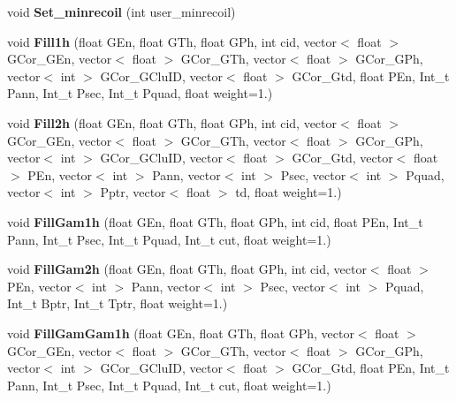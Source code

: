 \begin{DoxyCompactItemize}
\mbox{\label{classhists_acfb845682216224712565e7b8a1c3ce2}} 
void {\bfseries Set\+\_\+minrecoil} (int user\+\_\+minrecoil)
\item 
\mbox{\label{classhists_aa535a1d959dc46235b5d4096c03f37c4}} 
void {\bfseries Fill1h} (float G\+En, float G\+Th, float G\+Ph, int cid, vector$<$ float $>$ G\+Cor\+\_\+\+G\+En, vector$<$ float $>$ G\+Cor\+\_\+\+G\+Th, vector$<$ float $>$ G\+Cor\+\_\+\+G\+Ph, vector$<$ int $>$ G\+Cor\+\_\+\+G\+Clu\+ID, vector$<$ float $>$ G\+Cor\+\_\+\+Gtd, float P\+En, Int\+\_\+t Pann, Int\+\_\+t Psec, Int\+\_\+t Pquad, float weight=1.)
\item 
\mbox{\label{classhists_a265aaf58b352579cd02dfc1a3c011052}} 
void {\bfseries Fill2h} (float G\+En, float G\+Th, float G\+Ph, int cid, vector$<$ float $>$ G\+Cor\+\_\+\+G\+En, vector$<$ float $>$ G\+Cor\+\_\+\+G\+Th, vector$<$ float $>$ G\+Cor\+\_\+\+G\+Ph, vector$<$ int $>$ G\+Cor\+\_\+\+G\+Clu\+ID, vector$<$ float $>$ G\+Cor\+\_\+\+Gtd, vector$<$ float $>$ P\+En, vector$<$ int $>$ Pann, vector$<$ int $>$ Psec, vector$<$ int $>$ Pquad, vector$<$ int $>$ Pptr, vector$<$ float $>$ td, float weight=1.)
\item 
\mbox{\label{classhists_a73bd373657bbd42ab1eeedc816ff99b4}} 
void {\bfseries Fill\+Gam1h} (float G\+En, float G\+Th, float G\+Ph, int cid, float P\+En, Int\+\_\+t Pann, Int\+\_\+t Psec, Int\+\_\+t Pquad, Int\+\_\+t cut, float weight=1.)
\item 
\mbox{\label{classhists_ada7bda91decc166e1a3f970b993b1b20}} 
void {\bfseries Fill\+Gam2h} (float G\+En, float G\+Th, float G\+Ph, int cid, vector$<$ float $>$ P\+En, vector$<$ int $>$ Pann, vector$<$ int $>$ Psec, vector$<$ int $>$ Pquad, Int\+\_\+t Bptr, Int\+\_\+t Tptr, float weight=1.)
\item 
\mbox{\label{classhists_a7d1b75d24747c89c343d15c8826b3ecb}} 
void {\bfseries Fill\+Gam\+Gam1h} (float G\+En, float G\+Th, float G\+Ph, vector$<$ float $>$ G\+Cor\+\_\+\+G\+En, vector$<$ float $>$ G\+Cor\+\_\+\+G\+Th, vector$<$ float $>$ G\+Cor\+\_\+\+G\+Ph, vector$<$ int $>$ G\+Cor\+\_\+\+G\+Clu\+ID, vector$<$ float $>$ G\+Cor\+\_\+\+Gtd, float P\+En, Int\+\_\+t Pann, Int\+\_\+t Psec, Int\+\_\+t Pquad, Int\+\_\+t cut, float weight=1.)

\end{DoxyCompactItemize}
